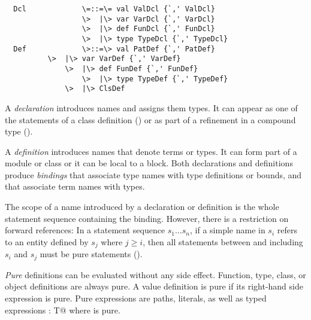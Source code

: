 \documentclass[11pt]{report}
\newcommand{\iflet}[1]{}
\begin{document}
\syntax\begin{verbatim}
  Dcl             \=::=\= val ValDcl {`,' ValDcl}
                  \>  |\> var VarDcl {`,' VarDcl}
                  \>  |\> def FunDcl {`,' FunDcl}
                  \>  |\> type TypeDcl {`,' TypeDcl}
  Def             \>::=\> val PatDef {`,' PatDef}
		  \>  |\> var VarDef {`,' VarDef}
  	          \>  |\> def FunDef {`,' FunDef}
                  \>  |\> type TypeDef {`,' TypeDef}
	          \>  |\> ClsDef
\end{verbatim}
\iflet{$\LET$ ValDef {`,' ValDef}}

A {\em declaration} introduces names and assigns them types. It can
appear as one of the statements of a class definition
() or as part of a refinement in a compound
type ().

A {\em definition} introduces names
that denote terms or types. It can form part of a module or class or
it can be local to a block.  Both declarations and definitions produce
{\em bindings} that associate type names with type definitions or
bounds, and that associate term names with types.

The scope of a name introduced by a declaration or definition is the
whole statement sequence containing the binding.  However, there is a
restriction on forward references: In a statement sequence $s_1 \ldots
s_n$, if a simple name in $s_i$ refers to an entity defined by $s_j$
where $j \geq i$, then all statements between and including $s_i$ and
$s_j$ must be pure statements ().

{\em Pure} definitions can be evaluated without any side effect.
Function, type, class, or object definitions are always pure. A value
definition is pure if its right-hand side expression is pure. Pure
expressions are paths, literals, as well as typed expressions
\verb@e: T@ where \verb@e@ is pure.

\end{document}
